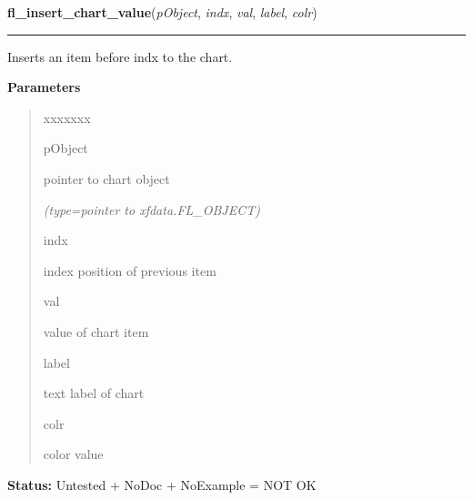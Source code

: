 \hspace{.8\funcindent}\begin{boxedminipage}{\funcwidth}

    \raggedright \textbf{fl\_insert\_chart\_value}(\textit{pObject}, \textit{indx}, \textit{val}, \textit{label}, \textit{colr})

    \vspace{-1.5ex}

    \rule{\textwidth}{0.5\fboxrule}
\setlength{\parskip}{2ex}
    Inserts an item before indx to the chart.

\setlength{\parskip}{1ex}
      \textbf{Parameters}
      \vspace{-1ex}

      \begin{quote}
        \begin{Ventry}{xxxxxxx}

          \item[pObject]

          pointer to chart object

            {\it (type=pointer to xfdata.FL\_OBJECT)}

          \item[indx]

          index position of previous item

          \item[val]

          value of chart item

          \item[label]

          text label of chart

          \item[colr]

          color value

        \end{Ventry}

      \end{quote}

\textbf{Status:} Untested + NoDoc + NoExample = NOT OK



    \end{boxedminipage}

    \label{xformslib:library:fl_replace_chart_value}

    \vspace{0.5ex}

